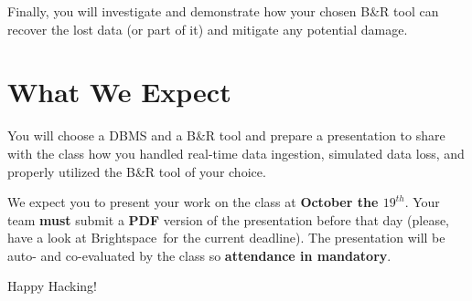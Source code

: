 \documentclass{article}
\begin{document}
Finally, you will investigate and demonstrate how your chosen B\&R tool can recover the lost data (or part of it) and mitigate any potential damage.

\section{What We Expect}
You will choose a DBMS and a B\&R tool and prepare a presentation to share with the class how you handled real-time data ingestion, simulated data loss, and properly utilized the B\&R tool of your choice.

We expect you to present your work on the class at \textbf{October the $19^{th}$}. Your team \textbf{\large must} submit a \textbf{PDF} version of the presentation before that day (please, have a look at Brightspace\texttrademark~for the current deadline).  The presentation will be auto- and co-evaluated by the class so \textbf{attendance in mandatory}.

\vspace{5mm}
Happy Hacking! 
\end{document}
